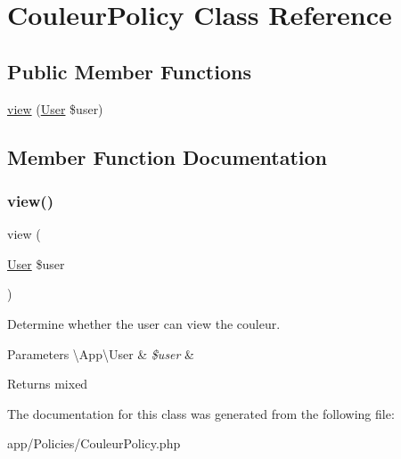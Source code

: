 \hypertarget{class_app_1_1_policies_1_1_couleur_policy}{}\section{Couleur\+Policy Class Reference}
\label{class_app_1_1_policies_1_1_couleur_policy}
\subsection*{Public Member Functions}
\begin{DoxyCompactItemize}
\item 
\mbox{\hyperlink{class_app_1_1_policies_1_1_couleur_policy_a7d2bfa2eab20cb1de3a321632440c315}{view}} (\mbox{\hyperlink{class_app_1_1_user}{User}} \$user)
\end{DoxyCompactItemize}


\subsection{Member Function Documentation}
\mbox{\label{class_app_1_1_policies_1_1_couleur_policy_a7d2bfa2eab20cb1de3a321632440c315}} 
\subsubsection{\texorpdfstring{view()}{view()}}
{\footnotesize\ttfamily view (\begin{DoxyParamCaption}\item[{\mbox{\hyperlink{class_app_1_1_user}{User}}}]{\$user }\end{DoxyParamCaption})}

Determine whether the user can view the couleur.


\begin{DoxyParams}[1]{Parameters}
\textbackslash{}\+App\textbackslash{}\+User & {\em \$user} & \\
\hline
\end{DoxyParams}
\begin{DoxyReturn}{Returns}
mixed 
\end{DoxyReturn}


The documentation for this class was generated from the following file\+:\begin{DoxyCompactItemize}
\item 
app/\+Policies/Couleur\+Policy.\+php\end{DoxyCompactItemize}
